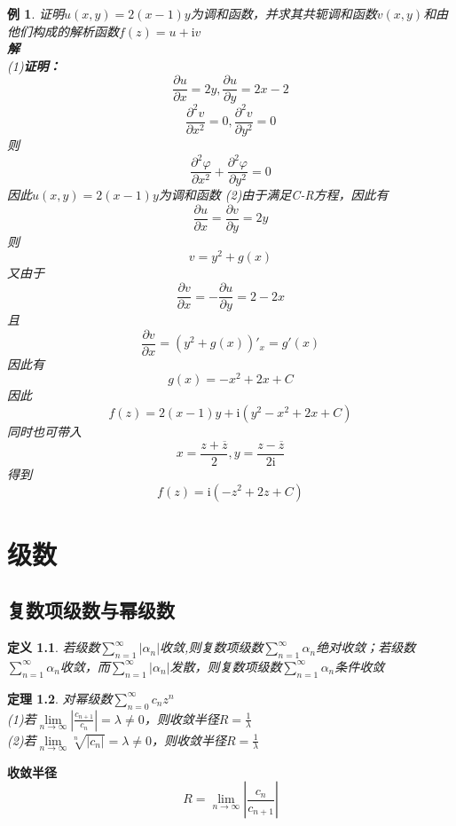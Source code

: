\documentclass[12pt, a4paper, twoside]{ctexbook}
\newtheorem{theorem}{定理}[section]
\newtheorem{definition}[theorem]{定义}
\newtheorem{example}[theorem]{例}
\begin{document}
\begin{example}
	证明$u\left(x,y\right)=2\left(x-1\right)y$为调和函数，并求其共轭调和函数$v\left(x,y\right)$和由他们构成的解析函数$f\left(z\right)=u+\mathrm{i}v$\\
	\hspace*{1em}\textbf{解}\\
	\hspace*{2em}(1)\textbf{证明：}
	$$
	\frac{\partial u}{\partial x}=2y,
	\frac{\partial u}{\partial y}=2x-2
	$$
	$$
	\frac{\partial ^2 v}{\partial x^2}=0,
	\frac{\partial ^2 v}{\partial y^2}=0
	$$
	\hspace*{2em}则
	$$
	\frac{\partial ^2 \varphi}{\partial x^2}+\frac{\partial ^2 \varphi}{\partial y^2}=0
	$$
	\hspace*{2em}因此$u\left(x,y\right)=2\left(x-1\right)y$为调和函数
	\newpage
	(2)由于满足C-R方程，因此有
	$$
	\frac{\partial u}{\partial x}=\frac{\partial v}{\partial y}=2y
	$$
	\hspace*{2em}则
	$$
	v=y^2+g\left(x\right)
	$$
	\hspace*{2em}又由于
	$$
	\frac{\partial v}{\partial x}=-\frac{\partial u}{\partial y}=2-2x
	$$
	\hspace*{2em}且
	$$
	\frac{\partial v}{\partial x}=\left(y^2+g\left(x\right)\right)'_x=g'\left(x\right)
	$$
	\hspace*{2em}因此有
	$$
	g\left(x\right)=-x^2+2x+C
	$$
	\hspace*{2em}因此
	$$
	f\left(z\right)=2\left(x-1\right)y+\mathrm{i}\left(y^2-x^2+2x+C\right)
	$$
	\hspace*{2em}同时也可带入
	$$
	x=\frac{z+\overline{z}}{2},y=\frac{z-\overline{z}}{2\mathrm{i}}
	$$
	\hspace*{2em}得到
	$$
	f\left(z\right)=\mathrm{i}\left(-z^2+2z+C\right)
	$$
\end{example}

\chapter{级数}
\newpage
\section{复数项级数与幂级数}
\begin{definition}
	若级数$\sum\limits_{n=1}^{\infty}{\left|\alpha_n\right|}$收敛,则复数项级数$\sum\limits_{n=1}^{\infty}{\alpha_n}$绝对收敛；若级数$\sum\limits_{n=1}^{\infty}{\alpha_n}$收敛，而$\sum\limits_{n=1}^{\infty}{\left|\alpha_n\right|}$发散，则复数项级数$\sum\limits_{n=1}^{\infty}{\alpha_n}$条件收敛\\
\end{definition}
\begin{theorem}
	对幂级数$\sum\limits_{n=0}^{\infty}{c_nz^n}$\\
	(1)若$\lim\limits_{n\to\infty}{\left|\frac{c_{n+1}}{c_n}\right|}=\lambda\neq0$，则收敛半径$R=\frac{1}{\lambda}$\\
	(2)若$\lim\limits_{n\to\infty}{\sqrt[n]{\left|c_n\right|}}=\lambda\neq0$，则收敛半径$R=\frac{1}{\lambda}$
\end{theorem}
\textbf{收敛半径}
$$
R=\lim\limits_{n\to\infty}{\left|\frac{c_n}{c_{n+1}}\right|}
$$
\end{document}
